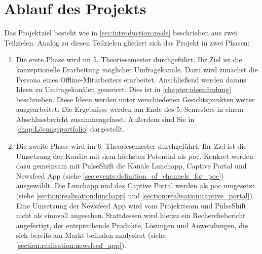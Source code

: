 \section{Ablauf des Projekts}

Das Projektziel besteht wie in \ref{sec:introduction:goals} beschrieben aus zwei Teilzielen. Analog zu diesen Teilzielen gliedert sich das Projekt in zwei Phasen:

\begin{enumerate}
\item Die erste Phase wird im 5. Theoriesemester durchgeführt. Ihr Ziel ist die konzeptionelle Erarbeitung möglicher Umfragekanäle. Dazu wird zunächst die Persona eines Offline-Mitarbeiters erarbeitet. Anschließend werden daraus Ideen zu Umfragekanälen generiert. Dies ist in \ref{chapter:ideenfindung} beschrieben. Diese Ideen werden unter verschiedenen Gesichtspunkten weiter ausgearbeitet. Die Ergebnisse werden am Ende des 5. Semesters in einem Abschlussbericht zusammengefasst. Außerdem sind Sie in \ref{chap:Lösungsportfolio} dargestellt.
\item Die zweite Phase wird im 6. Theoriesemester durchgeführt. Ihr Ziel ist die Umsetzung der Kanäle mit dem höchsten Potential als \gls{poc}. Konkret werden dazu gemeinsam mit PulseShift die Kanäle Lunchapp, Captive Portal und Newsfeed App (siehe \ref{sec:events:definition_of_channels_for_poc}) ausgewählt. Die Lunchapp und das Captive Portal werden als \gls{poc} umgesetzt (siehe \ref{section:realisation:lunchapp} und \ref{section:realisation:captive_portal}). Eine Umsetzung der Newsfeed App wird vom Projektteam und PulseShift nicht als sinnvoll angesehen. Stattdessen wird hierzu ein Recherchebericht angefertigt, der entsprechende Produkte, Lösungen und Anwendungen, die sich bereits am Markt befinden analysiert (siehe \ref{section:realisation:newsfeed_app}). 
\end{enumerate}
